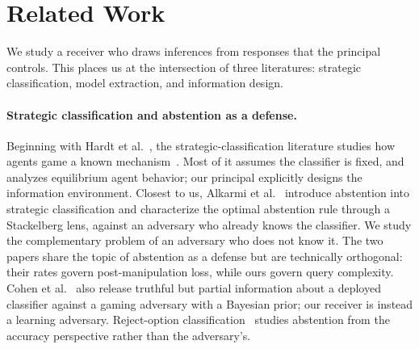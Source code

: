 \documentclass[runningheads,envcountsame]{llncs}
\begin{document}
\section{Related Work}
\label{sec:related}

We study a receiver who draws inferences from responses that the principal controls. This places us at the intersection of three literatures: strategic classification, model extraction, and information design.

\paragraph{Strategic classification and abstention as a defense.}
Beginning with Hardt et al.~\cite{hardt2016strategic}, the strategic-classification literature studies how agents game a known mechanism~\cite{dong2018strategic,chen2020learning,kleinberg2020classifiers}. Most of it assumes the classifier is fixed, and analyzes equilibrium agent behavior; our principal explicitly designs the information environment. Closest to us, Alkarmi et al.~\cite{alkarmi2025abstention} introduce abstention into strategic classification and characterize the optimal abstention rule through a Stackelberg lens, against an adversary who already knows the classifier. We study the complementary problem of an adversary who does not know it. The two papers share the topic of abstention as a defense but are technically orthogonal: their rates govern post-manipulation loss, while ours govern query complexity. Cohen et al.~\cite{cohen2024bayesian} also release truthful but partial information about a deployed classifier against a gaming adversary with a Bayesian prior; our receiver is instead a learning adversary. Reject-option classification~\cite{chow1970optimum,bartlett2008reject,cortes2016rejection} studies abstention from the accuracy perspective rather than the adversary's.
\end{document}
